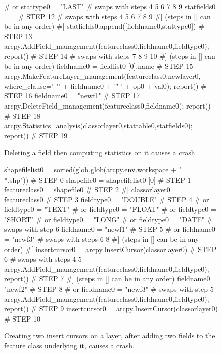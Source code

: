\begin{figure}
{\begin{code}
\#  or stattype0 = "LAST" 
\#  swaps with steps 4 5 6 7 8 9
statfields0 = []                                                                     \# STEP 12
\#  swaps with steps 4 5 6 7 8 9
\#] (steps in [] can be in any order)
\#[
statfields0.append([fieldname0,stattype0])                                           \# STEP 13
arcpy.AddField\_management(featureclass0,fieldname0,fieldtype0); report()             \# STEP 14
\#  swaps with steps 7 8 9 10
\#] (steps in [] can be in any order)
fieldname0 = fieldlist0 [0].name \# STEP 15
arcpy.MakeFeatureLayer\_management(featureclass0,newlayer0,
   where\_clause=' "' + fieldname0 + '" ' + op0 + val0); report()                     \# STEP 16
fieldname0 = "newf1"                                                                 \# STEP 17
arcpy.DeleteField\_management(featureclass0,fieldname0); report()                     \# STEP 18
arcpy.Statistics\_analysis(classorlayer0,stattable0,statfields0); report()            \# STEP 19
\end{code}
}
\caption{Deleting a field then computing statistics on it causes a crash.}
\label{fault2}
\end{figure}

\begin{figure}
{\scriptsize 
\begin{code}
shapefilelist0 = sorted(glob.glob(arcpy.env.workspace + "\\*.shp"))                   \# STEP 0
shapefile0 = shapefilelist0 [0]                                                      \# STEP 1
featureclass0 = shapefile0                                                           \# STEP 2
\#[
classorlayer0 = featureclass0                                                        \# STEP 3
fieldtype0 = "DOUBLE"                                                                \# STEP 4
\#  or fieldtype0 = "TEXT"
\#  or fieldtype0 = "FLOAT"
\#  or fieldtype0 = "SHORT"
\#  or fieldtype0 = "LONG"
\#  or fieldtype0 = "DATE"
\#  swaps with step 6
fieldname0 = "newf1"                                                                 \# STEP 5
\#  or fieldname0 = "newf3"
\#  swaps with steps 6 8
\#] (steps in [] can be in any order)
\#[
insertcursor0 = arcpy.InsertCursor(classorlayer0)                                    \# STEP 6
\#  swaps with steps 4 5
arcpy.AddField\_management(featureclass0,fieldname0,fieldtype0); report()             \# STEP 7
\#] (steps in [] can be in any order)
fieldname0 = "newf2"                                                                 \# STEP 8
\#  or fieldname0 = "newf3"
\#  swaps with step 5
arcpy.AddField\_management(featureclass0,fieldname0,fieldtype0); report()             \# STEP 9
insertcursor0 = arcpy.InsertCursor(classorlayer0)                                    \# STEP 10
\end{code}
}
\caption{Creating two insert cursors on a layer, after adding two fields to the feature class underlying it, causes a crash.}
\label{fault3}
\end{figure}

